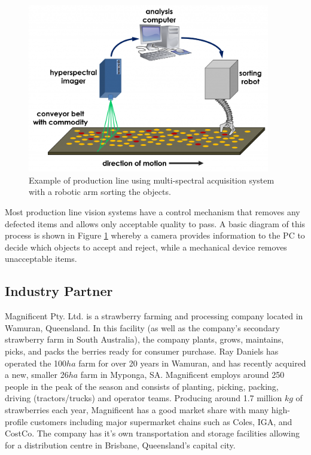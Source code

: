 \documentclass[fleqn,twoside]{article}
\begin{document}
\begin{figure}[ht]
	\centering
	\includegraphics[width=300pt]{images/machine_vision.png}
	\caption{Example of production line using multi-spectral acquisition system with a robotic arm sorting the objects.}
	\label{fig:machine_vision}
\end{figure}

Most production line vision systems have a control mechanism that removes any defected items and allows only acceptable quality to pass. A basic diagram of this process is shown in Figure \ref{fig:machine_vision} whereby a camera provides information to the PC to decide which objects to accept and reject, while a mechanical device removes unacceptable items. 




\subsection{Industry Partner}

Magnificent Pty. Ltd. is a strawberry farming and processing company located in Wamuran, Queensland. In this facility (as well as the company's secondary strawberry farm in South Australia), the company plants, grows, maintains, picks, and packs the berries ready for consumer purchase. Ray Daniels has operated the 100$ha$ farm for over 20 years in Wamuran, and has recently acquired a new, smaller 26$ha$ farm in Myponga, SA. Magnificent employs around 250 people in the peak of the season and consists of planting, picking, packing, driving (tractors/trucks) and operator teams. Producing around 1.7 million $kg$ of strawberries each year, Magnificent has a good market share with many high-profile customers including major supermarket chains such as Coles, IGA, and CostCo. The company has it's own transportation and storage facilities allowing for a distribution centre in Brisbane, Queensland's capital city. 
\end{document}
